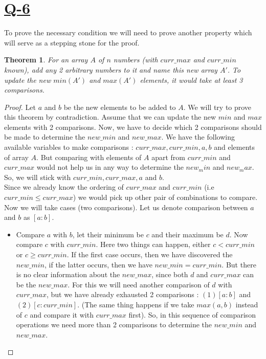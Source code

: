 \documentclass[14pt]{article}
\newtheorem{theorem}{Theorem}
\begin{document}
	\section*{\underline{Q-6}}
		\noindent
		To prove the necessary condition we will need to prove another property which will serve as a stepping stone for the proof.
		\begin{theorem}
			\label{theorem-1}
			For an array $A$ of $n$ numbers (with $curr\_max$ and $curr\_min$ known), add any 2 arbitrary numbers to it and name this new array $A'$. To update the new $min(A')$ and $max(A')$ elements, it would take at least 3 comparisons.
		\end{theorem}
		\begin{proof}
			Let $a$ and $b$ be the new elements to be added to $A$. We will try to prove this theorem by contradiction. Assume that we can update the new $min$ and $max$ elements with 2 comparisons. Now, we have to decide which 2 comparisons should be made to determine the $ new\_min $ and $ new\_max $. We have the following available variables to make comparisons : $ curr\_max, curr\_min, a, b $ and elements of array $A$. But comparing with elements of $A$ apart from $curr\_min$ and $curr\_max$ would not help us in any way to determine the $new_min$ and $new_max$. So, we will stick with $curr\_min, curr\_max, a$ and $b$. \\
			Since we already know the ordering of $curr\_max$ and $curr\_min$ (i.e $curr\_min \leq curr\_max$) we would pick up other pair of combinations to compare. Now we will take cases (two comparisons). Let us denote comparison between $a$ and $b$ as $ [a:b] $.
			\begin{itemize}
				\item Compare $a$ with $b$, let their minimum be $c$ and their maximum be $d$. Now compare $c$ with $curr\_min$. Here two things can happen, either $c < curr\_min$ or $c \geq curr\_min$. If the first case occurs, then we have discovered the $new\_min$, if the latter occurs, then we have $new\_min = curr\_min$. But there is no clear information about the $new\_max$, since both $d$ and $curr\_max$ can be the $new\_max$. For this we will need another comparison of $d$ with $curr\_max$, but we have already exhausted 2 comparisons : $(1) [a:b]$ and $(2) [c:curr\_min]$. (The same thing happens if we take $max(a, b)$ instead of $c$ and compare it with $curr\_max$ first). So, in this sequence of comparison operations we need more than 2 comparisons to determine the $new\_min$ and $new\_max$.
				

\end{itemize}
\end{proof}
\end{document}
